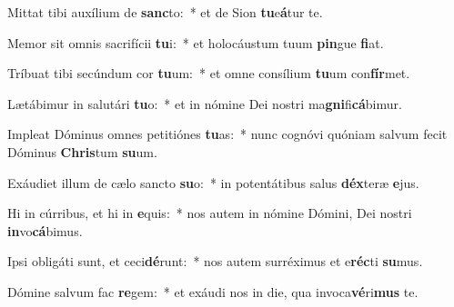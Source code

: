 \item Mittat tibi auxílium de \textbf{sanc}to:~* et de Sion \textbf{tu}e\textbf{á}tur te.
\item Memor sit omnis sacrifícii \textbf{tu}i:~* et holocáustum tuum \textbf{pin}gue \textbf{fi}at.
\item Tríbuat tibi secúndum cor \textbf{tu}um:~* et omne consílium \textbf{tu}um con\textbf{fír}met.
\item Lætábimur in salutári \textbf{tu}o:~* et in nómine Dei nostri ma\textbf{gni}fi\textbf{cá}bimur.
\item Impleat Dóminus omnes petitiónes \textbf{tu}as:~* nunc cognóvi quóniam salvum fecit Dóminus \textbf{Chris}tum \textbf{su}um.
\item Exáudiet illum de cælo sancto \textbf{su}o:~* in potentátibus salus \textbf{déx}teræ \textbf{e}jus.
\item Hi in cúrribus, et hi in \textbf{e}quis:~* nos autem in nómine Dómini, Dei nostri \textbf{in}vo\textbf{cá}bimus.
\item Ipsi obligáti sunt, et ceci\textbf{dé}runt:~* nos autem surréximus et e\textbf{réc}ti \textbf{su}mus.
\item Dómine salvum fac \textbf{re}gem:~* et exáudi nos in die, qua invoca\textbf{vé}ri\textbf{mus} te.
